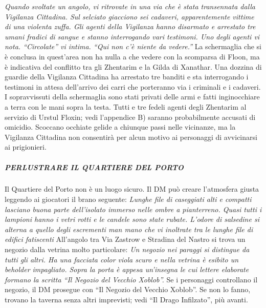 \documentclass{article}
\begin{document}
\textit{Quando svoltate un angolo, vi ritrovate in una via che è stata transennata dalla Vigilanza Cittadina. Sul selciato giacciono sei cadaveri, apparentemente vittime di una violenta zuffa. Gli agenti della Vigilanza hanno disarmato e arrestato tre umani fradici di sangue e stanno interrogando vari testimoni. Uno degli agenti vi nota. 
“Circolate” vi intima. “Qui non c'è niente da vedere.”}
\newline
    La schermaglia che si è conclusa in quest'area non ha nulla a che vedere con la scomparsa di Floon, ma è indicativa del conflitto tra gli Zhentarim e la Gilda di Xanathar. 
Una dozzina di guardie della Vigilanza Cittadina ha arrestato tre banditi e sta interrogando i testimoni in attesa dell’arrivo dei carri che porteranno via i criminali e i cadaveri. I sopravvissuti della schermaglia sono stati privati delle armi e fatti inginocchiare a terra con le mani sopra la testa. Tutti e tre fedeli agenti degli Zhentarim al servizio di Urstul Floxin; vedi l’appendice B) saranno probabilmente accusati di omicidio. Scoccano occhiate gelide a chiunque passi nelle vicinanze, ma la Vigilanza Cittadina non consentirà per alcun motivo ai personaggi di avvicinarsi ai prigionieri.


                        \subparagraph{PERLUSTRARE IL QUARTIERE DEL PORTO}Il Quartiere del Porto non è un luogo sicuro. Il DM può creare l'atmosfera giusta leggendo ai giocatori il brano seguente:\newline
\textit{Lunghe file di caseggiati alti e compatti lasciano buona parte dell'isolato immerso nelle ombre a pianterreno. 
Quasi tutti i lampioni hanno i vetri rotti e le candele sono state rubate. L'odore di salsedine si alterna a quello degli escrementi man mano che vi inoltrate tra le lunghe file di edifici fatiscenti}\newline
All’angolo tra Via Zastrow e Stradina del Nastro si trova un negozio dalla vetrina molto particolare:\newline
\textit{Un negozio nei paraggi si distingue da tutti gli altri. Ha una facciata color viola scuro e nella vetrina è esibito un beholder impagliato. Sopra la porta è appesa un'insegna le cui lettere elaborate formano la scritta “Il Negozio del Vecchio Xoblob”.}\newline
Se i personaggi controllano il negozio, il DM prosegue con “Il Negozio del Vecchio Xoblob”. Se non lo fanno, trovano la taverna senza altri imprevisti; vedi “Il Drago Infilzato”, più avanti.
\end{document}
